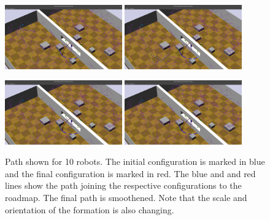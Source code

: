 \documentclass[12pt,a4paper, onecolumn]{IEEEtran}
\begin{document}
\begin{figure}[bpt]
  \centerline{\includegraphics[width=0.45\textwidth]{lPath_start.png} %
  \includegraphics[width=0.45\textwidth]{lPath_mid0.png}} \vspace{0.05in}
  \centerline{\includegraphics[width=0.45\textwidth]{lPath_mid.png} %
  \includegraphics[width=0.45\textwidth]{lPath_end.png}}
  \caption{Path shown for 10 robots. The initial configuration is marked in blue and the
  final configuration is marked in red. The blue and and red lines show the path joining
the respective configurations to the roadmap. The final path is smoothened. Note that the
scale and orientation of the formation is also changing.}
  \label{fig:ten}
\end{figure}
\end{document}
